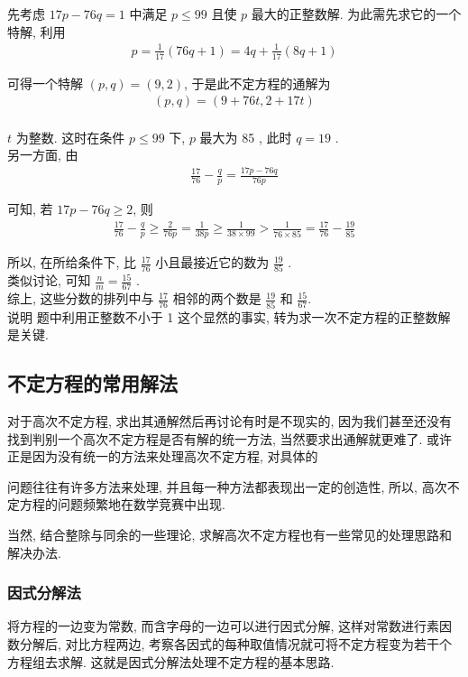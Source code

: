 先考虑 $17 p-76 q=1$ 中满足 $p \leqslant 99$ 且使 $p$ 最大的正整数解. 为此需先求它的一个特解, 利用
\begin{align*}
	p=\frac{1}{17}(76 q+1)=4 q+\frac{1}{17}(8 q+1)
\end{align*}

可得一个特解 $(p, q)=(9,2)$, 于是此不定方程的通解为
\begin{align*}
	(p, q)=(9+76 t, 2+17 t)
\end{align*}\\
$t$ 为整数. 这时在条件 $p \leqslant 99$ 下, $p$ 最大为 85 , 此时 $q=19$ . \\
另一方面, 由
\begin{align*}
	\frac{17}{76}-\frac{q}{p}=\frac{17 p-76 q}{76 p}
\end{align*}

可知, 若 $17 p-76 q \geqslant 2$, 则
\begin{align*}
	\frac{17}{76}-\frac{q}{p} \geqslant \frac{2}{76 p}=\frac{1}{38 p} \geqslant \frac{1}{38 \times 99}>\frac{1}{76 \times 85}=\frac{17}{76}-\frac{19}{85}
\end{align*}

所以, 在所给条件下, 比 $\frac{17}{76}$ 小且最接近它的数为 $\frac{19}{85}$ . \\
类似讨论, 可知 $\frac{n}{m}=\frac{15}{67}$ . \\
综上, 这些分数的排列中与 $\frac{17}{76}$ 相邻的两个数是 $\frac{19}{85}$ 和 $\frac{15}{67}$.\\
说明 题中利用正整数不小于 1 这个显然的事实, 转为求一次不定方程的正整数解是关键.

\subsection{不定方程的常用解法}
对于高次不定方程, 求出其通解然后再讨论有时是不现实的, 因为我们甚至还没有找到判别一个高次不定方程是否有解的统一方法, 当然要求出通解就更难了. 或许正是因为没有统一的方法来处理高次不定方程, 对具体的

问题往往有许多方法来处理, 并且每一种方法都表现出一定的创造性, 所以, 高次不定方程的问题频繁地在数学竞赛中出现.

当然, 结合整除与同余的一些理论, 求解高次不定方程也有一些常见的处理思路和解决办法.

\subsubsection{因式分解法}
将方程的一边变为常数, 而含字母的一边可以进行因式分解, 这样对常数进行素因数分解后, 对比方程两边, 考察各因式的每种取值情况就可将不定方程变为若干个方程组去求解. 这就是因式分解法处理不定方程的基本思路.

